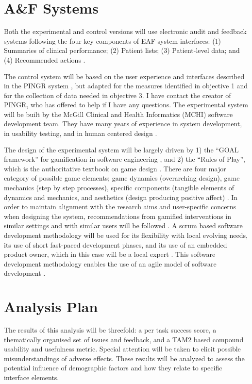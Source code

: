 \section{A\&F Systems}
Both the experimental and control versions will use electronic audit and feedback systems following the four key components of \gls{EAF} system interfaces: (1) Summaries of clinical performance; (2) Patient lists; (3) Patient-level data; and (4) Recommended actions \cite{brown2015meta}.

The control system will be based on the user experience and interfaces described in the PINGR system \cite{brown2016interface}, but adapted for the measures identified in objective 1 and for the collection of data needed in objective 3. I have contact the creator of PINGR, who has offered to help if I have any questions. The experimental system will be built by the McGill Clinical and Health Informatics (MCHI) software development team. They have many years of experience in system development, in usability testing, and in human centered design \cite{shaban2017pophr, lavigne2013hybrid, buckeridge2016developing}.

The design of the experimental system will be largely driven by 1) the ``GOAL framework'' for gamification in software engineering \cite{garcia2017framework}, and 2) the ``Rules of Play'', which is  the authoritative textbook on game design \cite{salen2004rules}. There are four major category of possible game elements; game dynamics (overarching design), game mechanics (step by step processes), specific components (tangible elements of dynamics and mechanics, and aesthetics (design producing positive affect) \cite{mckeown2016gamification}. In order to maintain alignment with the research aims and user-specific concerns when designing the system, recommendations from gamified interventions in similar settings and with similar users will be followed \cite{mckeown2016gamification}. A scrum based software development methodology will be used for its flexibility with local evolving needs, its use of short fast-paced development phases, and its use of an embedded product owner, which in this case will be a local expert \cite{cohn2010succeeding}. This software development methodology enables the use of an agile model of software development \cite{beck2001manifesto}.

\section{Analysis Plan}
The results of this analysis will be threefold: a per task success score, a thematically organised set of issues and feedback, and a TAM2 based compound usability and usefulness metric. Special attention will be taken to elicit possible misunderstandings of adverse effects. These results will be analyzed to assess the potential influence of demographic factors and how they relate to specific interface elements.

